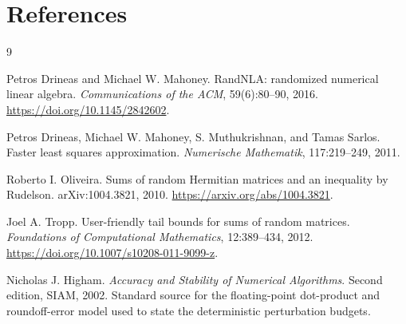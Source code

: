 \documentclass[11pt]{article}
\theoremstyle{remark}
\begin{document}
\section*{References}

\begin{thebibliography}{9}

Petros Drineas and Michael W. Mahoney.
\newblock RandNLA: randomized numerical linear algebra.
\newblock \emph{Communications of the ACM}, 59(6):80--90, 2016.
\newblock \url{https://doi.org/10.1145/2842602}.

Petros Drineas, Michael W. Mahoney, S. Muthukrishnan, and Tamas Sarlos.
\newblock Faster least squares approximation.
\newblock \emph{Numerische Mathematik}, 117:219--249, 2011.

Roberto I. Oliveira.
\newblock Sums of random Hermitian matrices and an inequality by Rudelson.
\newblock arXiv:1004.3821, 2010.
\newblock \url{https://arxiv.org/abs/1004.3821}.

Joel A. Tropp.
\newblock User-friendly tail bounds for sums of random matrices.
\newblock \emph{Foundations of Computational Mathematics}, 12:389--434, 2012.
\newblock \url{https://doi.org/10.1007/s10208-011-9099-z}.

Nicholas J. Higham.
\newblock \emph{Accuracy and Stability of Numerical Algorithms}.
\newblock Second edition, SIAM, 2002.
\newblock Standard source for the floating-point dot-product and
roundoff-error model used to state the deterministic perturbation budgets.

\end{thebibliography}
\end{document}
